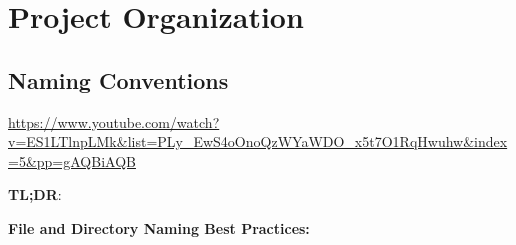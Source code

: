 \documentclass[
  letterpaper,
  DIV=11,
  numbers=noendperiod]{scrreprt}
\begin{document}


\chapter*{\texorpdfstring{ Project
Organization}{ Project Organization}}\label{project-organization}


\section*{Naming Conventions}\label{naming-conventions}


\url{https://www.youtube.com/watch?v=ES1LTlnpLMk&list=PLy_EwS4oOnoQzWYaWDO_x5t7O1RqHwuhw&index=5&pp=gAQBiAQB}

\textbf{TL;DR}:

\textbf{File and Directory Naming Best Practices:}
\end{document}
